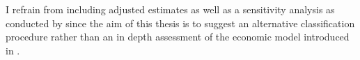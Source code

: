 I refrain from including adjusted estimates as well as a sensitivity analysis as conducted by \textcite{Ellingsen.2003} since the aim of this thesis is to suggest an alternative classification procedure rather than an in depth assessment of the economic model introduced in \textcite{Ellingsen.2001}.
%